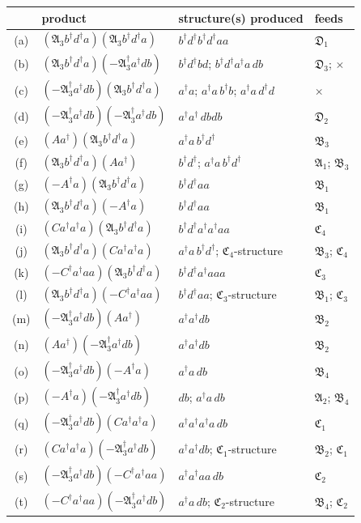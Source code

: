 \documentclass[11pt]{article}
\newcommand{\mf}{\mathfrak}
\newcommand{\dg}{\dagger}
\begin{document}
\begin{center}
\renewcommand{\arraystretch}{1.15}
\begin{tabular}{clll}
\hline
& product & structure(s) produced & feeds\\
\hline
(a)&$(\mf A_{3}b^{\dg}d^{\dg}a)(\mf A_{3}b^{\dg}d^{\dg}a)$ & $b^{\dg}d^{\dg}b^{\dg}d^{\dg}aa$ & $\mf D_{1}$\\
(b)&$(\mf A_{3}b^{\dg}d^{\dg}a)(-\mf A^{\dg}_{3}a^{\dg}db)$ & $b^{\dg}d^{\dg}bd$; $b^{\dg}d^{\dg}a^{\dg}a\,db$ & $\mf D_{3}$; $\times$\\
(c)&$(-\mf A^{\dg}_{3}a^{\dg}db)(\mf A_{3}b^{\dg}d^{\dg}a)$ & $a^{\dg}a$; $a^{\dg}a\,b^{\dg}b$; $a^{\dg}a\,d^{\dg}d$ & $\times$\\
(d)&$(-\mf A^{\dg}_{3}a^{\dg}db)(-\mf A^{\dg}_{3}a^{\dg}db)$ & $a^{\dg}a^{\dg}\,dbdb$ & $\mf D_{2}$\\
(e)&$(Aa^{\dg})(\mf A_{3}b^{\dg}d^{\dg}a)$ & $a^{\dg}a\,b^{\dg}d^{\dg}$ & $\mf B_{3}$\\
(f)&$(\mf A_{3}b^{\dg}d^{\dg}a)(Aa^{\dg})$ & $b^{\dg}d^{\dg}$; $a^{\dg}a\,b^{\dg}d^{\dg}$ & $\mf A_{1}$; $\mf B_{3}$\\
(g)&$(-A^{\dg}a)(\mf A_{3}b^{\dg}d^{\dg}a)$ & $b^{\dg}d^{\dg}aa$ & $\mf B_{1}$\\
(h)&$(\mf A_{3}b^{\dg}d^{\dg}a)(-A^{\dg}a)$ & $b^{\dg}d^{\dg}aa$ & $\mf B_{1}$\\
(i)&$(Ca^{\dg}a^{\dg}a)(\mf A_{3}b^{\dg}d^{\dg}a)$ & $b^{\dg}d^{\dg}a^{\dg}a^{\dg}aa$ & $\mf C_{4}$\\
(j)&$(\mf A_{3}b^{\dg}d^{\dg}a)(Ca^{\dg}a^{\dg}a)$ & $a^{\dg}a\,b^{\dg}d^{\dg}$; $\mf C_{4}$-structure & $\mf B_{3}$; $\mf C_{4}$\\
(k)&$(-C^{\dg}a^{\dg}aa)(\mf A_{3}b^{\dg}d^{\dg}a)$ & $b^{\dg}d^{\dg}a^{\dg}aaa$ & $\mf C_{3}$\\
(l)&$(\mf A_{3}b^{\dg}d^{\dg}a)(-C^{\dg}a^{\dg}aa)$ & $b^{\dg}d^{\dg}aa$; $\mf C_{3}$-structure & $\mf B_{1}$; $\mf C_{3}$\\
(m)&$(-\mf A^{\dg}_{3}a^{\dg}db)(Aa^{\dg})$ & $a^{\dg}a^{\dg}db$ & $\mf B_{2}$\\
(n)&$(Aa^{\dg})(-\mf A^{\dg}_{3}a^{\dg}db)$ & $a^{\dg}a^{\dg}db$ & $\mf B_{2}$\\
(o)&$(-\mf A^{\dg}_{3}a^{\dg}db)(-A^{\dg}a)$ & $a^{\dg}a\,db$ & $\mf B_{4}$\\
(p)&$(-A^{\dg}a)(-\mf A^{\dg}_{3}a^{\dg}db)$ & $db$; $a^{\dg}a\,db$ & $\mf A_{2}$; $\mf B_{4}$\\
(q)&$(-\mf A^{\dg}_{3}a^{\dg}db)(Ca^{\dg}a^{\dg}a)$ & $a^{\dg}a^{\dg}a^{\dg}a\,db$ & $\mf C_{1}$\\
(r)&$(Ca^{\dg}a^{\dg}a)(-\mf A^{\dg}_{3}a^{\dg}db)$ & $a^{\dg}a^{\dg}db$; $\mf C_{1}$-structure & $\mf B_{2}$; $\mf C_{1}$\\
(s)&$(-\mf A^{\dg}_{3}a^{\dg}db)(-C^{\dg}a^{\dg}aa)$ & $a^{\dg}a^{\dg}aa\,db$ & $\mf C_{2}$\\
(t)&$(-C^{\dg}a^{\dg}aa)(-\mf A^{\dg}_{3}a^{\dg}db)$ & $a^{\dg}a\,db$; $\mf C_{2}$-structure & $\mf B_{4}$; $\mf C_{2}$\\
\hline
\end{tabular}
\end{center}
\end{document}
